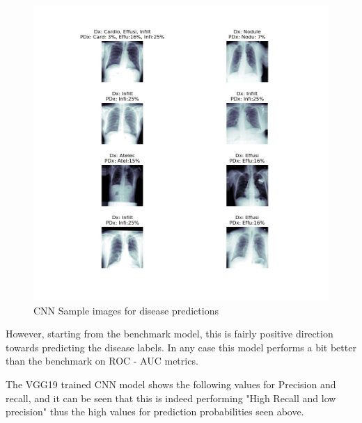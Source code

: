 \documentclass{article}
\begin{document}
    \begin{figure}
        \includegraphics[width=\linewidth]{./images/chestr-cnn_sample-images-pred-view.jpg}
        \caption{CNN Sample images for disease predictions}
        \label{fig:cnn-samples-predictions}
    \end{figure}

    However, starting from the benchmark model, this is fairly positive direction towards predicting the disease labels. In any case this model performs a bit better than the benchmark on ROC - AUC metrics. 

    The VGG19 trained CNN model shows the following values for Precision and recall, and it can be seen that this is indeed performing "High Recall and low precision" thus the high values for prediction probabilities seen above.
\end{document}
